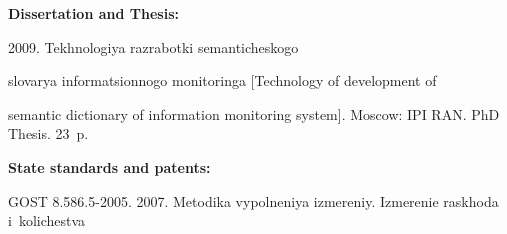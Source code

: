 {\begin{enumerate}[1.]

































\noindent


\textbf{Dissertation and Thesis:}














 2009. Tekhnologiya razrabotki semanticheskogo


slovarya informatsionnogo monitoringa [Technology of development of


semantic dictionary of information monitoring system].  Moscow: IPI RAN. PhD Thesis. 23~p.








\noindent


\textbf{State standards and patents:}





GOST 8.586.5-2005. 2007. Metodika vypolneniya izmereniy. Izmerenie raskhoda i~kolichestva



\end{enumerate}}
